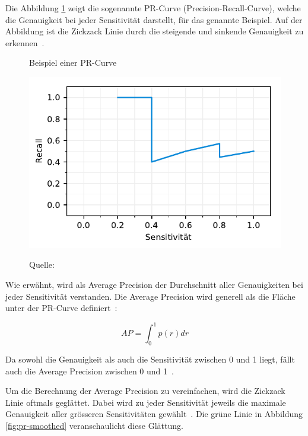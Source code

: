 Die Abbildung \ref{fig:ap-pr} zeigt die sogenannte PR-Curve (Precision-Recall-Curve), welche die Genauigkeit bei jeder Sensitivität darstellt, für das genannte Beispiel. Auf der Abbildung ist die Zickzack Linie durch die steigende und sinkende Genauigkeit zu erkennen~\autocite{AP}.

\begin{figure}[h!]
    \captionsetup{width=.9\linewidth}
    \caption{Beispiel einer PR-Curve}
    \label{fig:ap-pr}
    \centering
    \includegraphics[scale=1]{graphics/matplot/ap__pr.pdf}\\
    \caption*{Quelle: \textcite{AP}}
\end{figure}

Wie erwähnt, wird als Average Precision der Durchschnitt aller Genauigkeiten bei jeder Sensitivität verstanden. Die Average Precision wird generell als die Fläche unter der PR-Curve definiert~\autocite{AP}:

$$AP = \int_{0}^{1}p(r)dr$$

Da sowohl die Genauigkeit als auch die Sensitivität zwischen 0 und 1 liegt, fällt auch die Average Precision zwischen 0 und 1~\autocite{AP}.

Um die Berechnung der Average Precision zu vereinfachen, wird die Zickzack Linie oftmals geglättet. Dabei wird zu jeder Sensitivität jeweils die maximale Genauigkeit aller grösseren Sensitivitäten gewählt~\autocite{AP}. Die grüne Linie in Abbildung \ref{fig:pr-smoothed} veranschaulicht diese Glättung.

